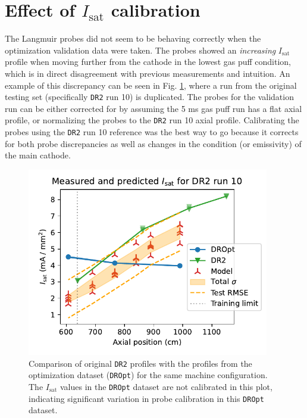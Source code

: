 \section{Effect of $I_\text{sat}$ calibration \label{app:calib}}


The Langmuir probes did not seem to be behaving correctly when the optimization validation data were taken. The probes showed an \emph{increasing} $I_\text{sat}$ profile when moving further from the cathode in the lowest gas puff condition, which is in direct disagreement with previous measurements and intuition. An example of this discrepancy can be seen in Fig. \ref{fig:DR2-10_LHS-30_valdiation}, where a run from the original testing set (specifically \texttt{DR2} run 10) is duplicated. The probes for the validation run can be either corrected for by assuming the 5 ms gas puff run has a flat axial profile, or normalizing the probes to the \texttt{DR2} run 10 axial profile. Calibrating the probes using the \texttt{DR2} run 10 reference was the best way to go because it corrects for both probe discrepancies as well as changes in the condition (or emissivity) of the main cathode. 

\begin{figure}
	\centering
	\includegraphics[width=300pt]{figures/DR2-10_LHS-30_valdiation.pdf}
	\caption[Comparison of original \texttt{DR2} profiles with the profiles from \texttt{DROpt}]{\label{fig:DR2-10_LHS-30_valdiation}Comparison of original \texttt{DR2} profiles with the profiles from the optimization dataset (\texttt{DROpt}) for the same machine configuration. The $I_\text{sat}$ values in the \texttt{DROpt} dataset are not calibrated in this plot, indicating significant variation in probe calibration in this \texttt{DROpt} dataset.}
\end{figure}


